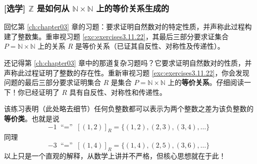 \subsubsection*{[选学] $\mathbb{Z}$ 是如何从 $\mathbb{N} \times \mathbb{N}$ 上的等价关系生成的}

回忆第 \ref{ch:chapter03} 章的习题：要求证明自然数对的特定性质，并声称此过程构建了整数集。重审视习题 \ref{exc:exercises3.11.22}，其最后三部分要求证集合 $P = \mathbb{N} \times \mathbb{N}$ 上的关系 $R$ 是等价关系（已证其自反性、对称性及传递性）。

还记得第 \ref{ch:chapter03} 章中的那道复杂习题吗？它要求证明自然数对的性质，并声称此过程证明了整数的存在性。重新审视习题 \ref{exc:exercises3.11.22}，你会发现问题的最后三部分要求证明集合 $R$ 是集合 $P = \mathbb{N} \times \mathbb{N}$ 上的\textbf{等价关系}。仔细阅读一下！你已经证明了 $R$ 具有自反性、对称性和传递性。

该练习表明（此处略去细节）任何负整数都可以表示为两个整数之差为该负整数的\textbf{等价类}。也就是说
\[-1 \;\text{``$=$''}\; [(1, 2)]_R = \{(1, 2),(2, 3),(3, 4), \dots \}\]
同理
\[-3 \;\text{``$=$''}\; [(1, 4)]_R = \{(1, 4),(2, 5),(3, 6), \dots \}\]
以上只是一个直观的解释，从数学上讲并不严格，但核心思想就在于此！

